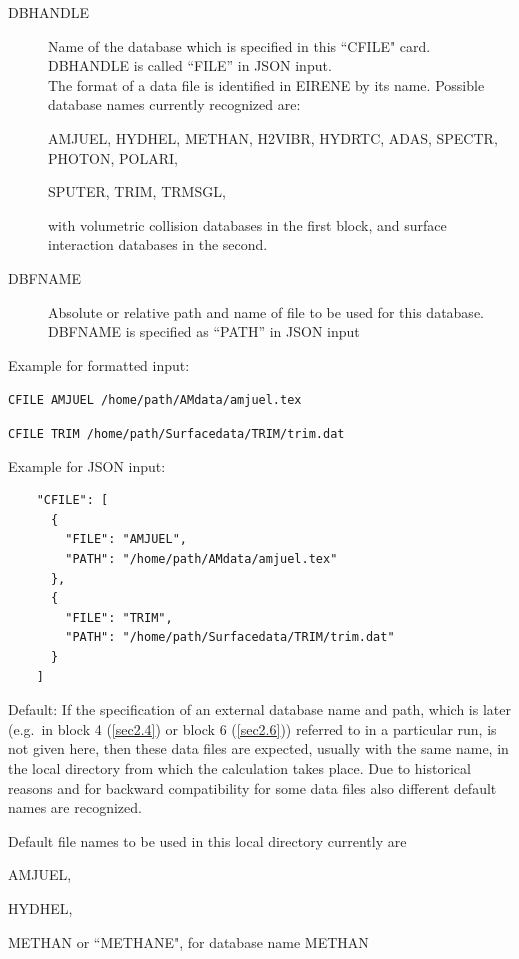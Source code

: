 \begin{description}
  \item[DBHANDLE] Name of the database which is specified in this ``CFILE" card.\\
  	  DBHANDLE is called ``FILE'' in JSON input. \\
        The format of a data file is identified in EIRENE by its name.
        Possible database names currently recognized are:

        AMJUEL, HYDHEL, METHAN, H2VIBR, HYDRTC, ADAS,  SPECTR, PHOTON, POLARI,

        \medskip

        SPUTER, TRIM,  TRMSGL,

        with volumetric collision databases in the first block, and surface interaction
        databases in the second.
  \item[DBFNAME] Absolute or relative path and name of file to be used for this
        database. \\
        DBFNAME is specified as ``PATH'' in JSON input
\end{description}
Example for formatted input:

\lstinline|CFILE AMJUEL /home/path/AMdata/amjuel.tex|

\lstinline|CFILE TRIM /home/path/Surfacedata/TRIM/trim.dat|

\medskip

Example for JSON input:
\begin{lstlisting}
    "CFILE": [
      {
        "FILE": "AMJUEL",
        "PATH": "/home/path/AMdata/amjuel.tex"
      },
      {
        "FILE": "TRIM",
        "PATH": "/home/path/Surfacedata/TRIM/trim.dat"
      }
    ]
\end{lstlisting}

Default:
If the specification of an external database name and path, which is later
(e.g.\ in block 4 (\cref{sec2.4}) or block 6 (\cref{sec2.6})) referred to in a
particular run, is not given here, then these data files are expected, usually
with the same name, in the local directory from which the calculation takes
place.
Due to historical reasons and for backward compatibility for some data files
also different default names are recognized.

Default file names to be used in this local directory currently are

AMJUEL,

HYDHEL,

METHAN or ``METHANE", for database name METHAN

